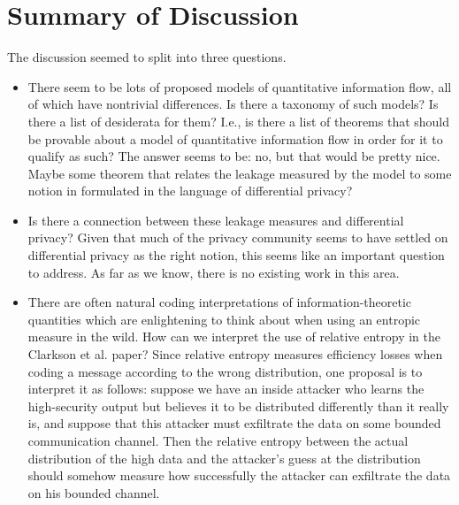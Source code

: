 \documentclass[10pt]{amsart}
\begin{document}
\section{Summary of Discussion}
The discussion seemed to split into three questions.
\begin{itemize}
  \item There seem to be lots of proposed models of quantitative information
    flow, all of which have nontrivial differences. Is there a taxonomy of such
    models? Is there a list of desiderata for them? I.e., is there a list of
    theorems that should be provable about a model of quantitative information
    flow in order for it to qualify as such? The answer seems to be: no, but
    that would be pretty nice. Maybe some theorem that relates the leakage
    measured by the model to some notion in formulated in the language of
    differential privacy?
  \item Is there a connection between these leakage measures and differential
    privacy? Given that much of the privacy community seems to have settled on
    differential privacy as the right notion, this seems like an important
    question to address. As far as we know, there is no existing work in this
    area.
  \item There are often natural coding interpretations of information-theoretic
    quantities which are enlightening to think about when using an entropic
    measure in the wild. How can we interpret the use of relative entropy in 
    the Clarkson et al. paper? Since relative entropy measures efficiency losses
    when coding a message according to the wrong distribution, one proposal is
    to interpret it as follows: suppose we have an inside attacker who learns 
    the high-security output but believes it to be distributed differently than
    it really is, and suppose that this attacker must exfiltrate the data on some
    bounded communication channel. Then the relative entropy between the actual
    distribution of the high data and the attacker's guess at the distribution
    should somehow measure how successfully the attacker can exfiltrate the data
    on his bounded channel.
\end{itemize}




\end{document}
